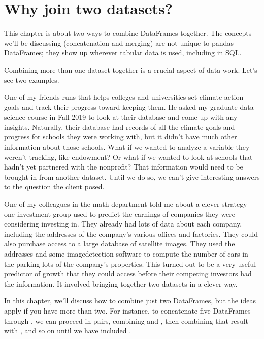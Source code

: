 \documentclass[letterpaper,10pt,english]{jupyterBook}
\begin{document}
\section{Why join two datasets?}
\label{\detokenize{chapter-12-concat-and-merge:why-join-two-datasets}}
\sphinxAtStartPar
This chapter is about two ways to combine DataFrames together.  The concepts we’ll be discussing (concatenation and merging) are not unique to pandas DataFrames; they show up wherever tabular data is used, including in SQL.

\sphinxAtStartPar
Combining more than one dataset together is a crucial aspect of data work.  Let’s see two examples.

\sphinxAtStartPar
{}  One of my friends runs  that helps colleges and universities set climate action goals and track their progress toward keeping them.  He asked my graduate data science course in Fall 2019 to look at their database and come up with any insights.  Naturally, their database had records of all the climate goals and progress for schools they were working with, but it didn’t have much other information about those schools.  What if we wanted to analyze a variable they weren’t tracking, like endowment?  Or what if we wanted to look at schools that hadn’t yet partnered with the nonprofit?  That information would need to be brought in from another dataset.  Until we do so, we can’t give interesting answers to the question the client posed.

\sphinxAtStartPar
{}  One of my colleagues in the math department told me about a clever strategy one investment group used to predict the earnings of companies they were considering investing in.  They already had lots of data about each company, including the addresses of the company’s various offices and factories.  They could also purchase access to a large database of satellite images.  They used the addresses and some image\sphinxhyphen{}detection software to compute the number of cars in the parking lots of the company’s properties.  This turned out to be a very useful predictor of growth that they could access before their competing investors had the information.  It involved bringing together two datasets in a clever way.

\sphinxAtStartPar
In this chapter, we’ll discuss how to combine just two DataFrames, but the ideas apply if you have more than two.  For instance, to concatenate five DataFrames  through , we can proceed in pairs, combining  and , then combining that result with , and so on until we have included .
\end{document}
